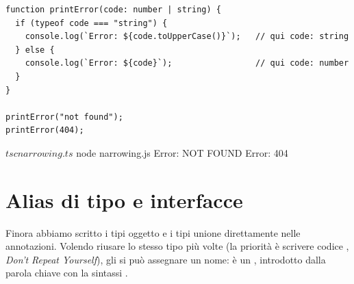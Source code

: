 \begin{affianco}[0.6][c]
\codicepiccolo
\begin{lstlisting}[style=ts, name=narrowing.ts]
function printError(code: number | string) {
  if (typeof code === "string") {
    console.log(`Error: ${code.toUpperCase()}`);   // qui code: string
  } else {
    console.log(`Error: ${code}`);                 // qui code: number
  }
}

printError("not found");
printError(404);
\end{lstlisting}
\risultato
\begin{immagine}
\end{immagine}
\end{affianco}

\begin{console}[Terminale]
$ tsc narrowing.ts
$ node narrowing.js
Error: NOT FOUND
Error: 404
\end{console}

\section{Alias di tipo e interfacce}

Finora abbiamo scritto i tipi oggetto e i tipi unione direttamente nelle
annotazioni. Volendo riusare lo stesso tipo più volte (la priorità è scrivere
codice , \textit{Don't Repeat Yourself}), gli si può assegnare un
nome: è un , introdotto dalla parola chiave 
con la sintassi .

